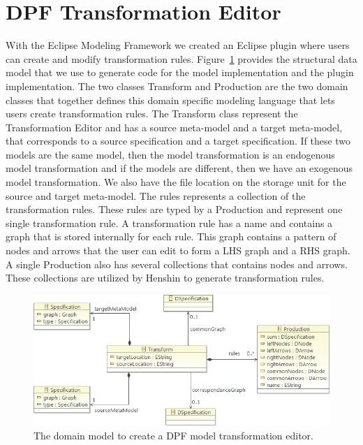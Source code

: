 \section{DPF Transformation Editor}

With the Eclipse Modeling Framework we created an Eclipse plugin where users can
create and modify transformation rules. Figure~\ref{fig:transform_metamodel}
provides the structural data model that we use to generate code for the model
implementation and the plugin implementation. The two classes Transform and
Production are the two domain classes that together defines this domain specific
modeling language that lets users create transformation rules. The Transform
class represent the Transformation Editor and has a source meta-model and a
target meta-model, that corresponds to a source specification and a target
specification. If these two models are the same model, then the model
transformation is an endogenous model transformation and if the models are
different, then we have an exogenous model transformation. We also have the file
location on the storage unit for the source and target meta-model. The rules
represents a collection of the transformation rules. These rules are typed by a
Production and represent one single transformation rule. A transformation
rule has a name and contains a graph that is stored internally for each rule.
This graph contains a pattern of nodes and arrows that the user can edit to
form a LHS graph and a RHS graph. A single Production also has several
collections that contains nodes and arrows. These collections are utilized by
Henshin to generate transformation rules. 

\begin{figure}[H]
	\centering
	\includegraphics[scale=0.8]{./Figures/transform_metamodel_ecore.png}
	\caption[Model for the Transformation Editor]
	{The domain model to create a DPF model transformation editor.}
	\label{fig:transform_metamodel}
\end{figure}

